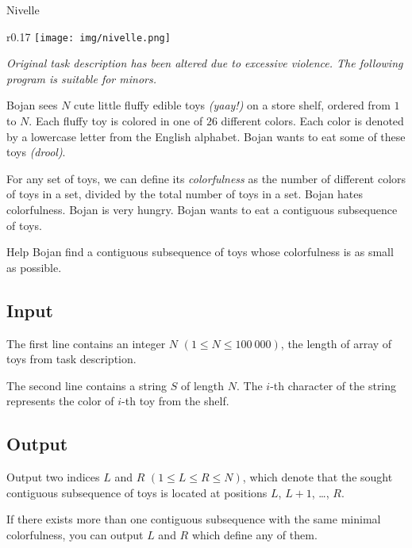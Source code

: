 \begin{statement}[
  problempoints=110,
  timelimit=1 second,
  memorylimit=512 MiB,
]{Nivelle}

\setlength\intextsep{-0.1cm}
\begin{wrapfigure}[9]{r}{0.17\textwidth}
\centering
\texttt{[image: img/nivelle.png]}
\end{wrapfigure}

\textit{Original task description has been altered due to excessive violence.
The following program is suitable for minors.}

Bojan sees $N$ cute little fluffy edible toys \textit{(yaay!)} on a store shelf,
ordered from $1$ to $N$. Each fluffy toy is colored in one of $26$ different
colors. Each color is denoted by a lowercase letter from the English alphabet.
Bojan wants to eat some of these toys \textit{(drool)}.

For any set of toys, we can define its \textit{colorfulness} as the number of
different colors of toys in a set, divided by the total number of toys in a
set. Bojan hates colorfulness. Bojan is very hungry. Bojan wants to eat a
contiguous subsequence of toys.

Help Bojan find a contiguous subsequence of toys whose colorfulness is as
small as possible.

\subsection*{Input}
The first line contains an integer $N$ $(1 \le N \le 100\ 000)$, the length
of array of toys from task description.

The second line contains a string $S$ of length $N$. The $i$-th character of
the string represents the color of $i$-th toy from the shelf.

\subsection*{Output}
Output two indices $L$ and $R$ $(1 \le L \le R \le N)$, which denote that the
sought contiguous subsequence of toys is located at positions $L$, $L+1$,
\dots, $R$.

If there exists more than one contiguous subsequence with the same minimal
colorfulness, you can output $L$ and $R$ which define any of them.


\end{statement}
